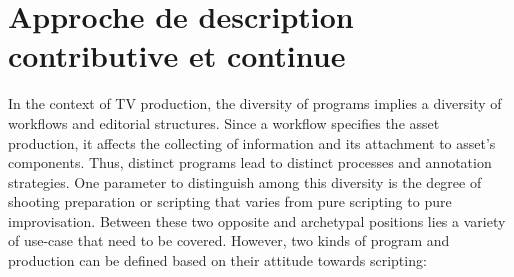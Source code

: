 







\section{Approche de description contributive et continue}\label{sec:approche}

\begin{cico}
 
\end{cico} 

In the context of TV production, the diversity of programs implies a diversity of workflows and editorial structures. Since a workflow specifies the asset production, it affects the collecting of information and its attachment to asset's components. Thus, distinct programs lead to distinct processes and annotation strategies. One parameter to distinguish among this diversity is the degree of shooting preparation or scripting that varies from pure scripting to pure improvisation. Between these two opposite and archetypal positions lies a variety of use-case that need to be covered. However, two kinds of program and production can be defined based on their attitude towards scripting:

